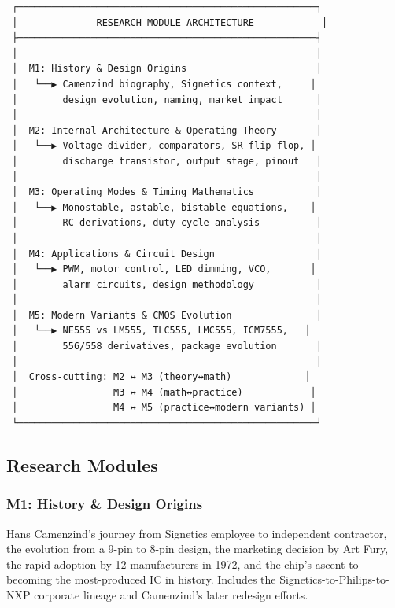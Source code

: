 \documentclass[11pt,letterpaper]{article}
\begin{document}
\begin{asciibox}
\begin{verbatim}
 ┌─────────────────────────────────────────────────────┐
 │              RESEARCH MODULE ARCHITECTURE            │
 ├─────────────────────────────────────────────────────┤
 │                                                     │
 │  M1: History & Design Origins                       │
 │   └──▶ Camenzind biography, Signetics context,     │
 │        design evolution, naming, market impact      │
 │                                                     │
 │  M2: Internal Architecture & Operating Theory       │
 │   └──▶ Voltage divider, comparators, SR flip-flop, │
 │        discharge transistor, output stage, pinout   │
 │                                                     │
 │  M3: Operating Modes & Timing Mathematics           │
 │   └──▶ Monostable, astable, bistable equations,    │
 │        RC derivations, duty cycle analysis          │
 │                                                     │
 │  M4: Applications & Circuit Design                  │
 │   └──▶ PWM, motor control, LED dimming, VCO,       │
 │        alarm circuits, design methodology           │
 │                                                     │
 │  M5: Modern Variants & CMOS Evolution               │
 │   └──▶ NE555 vs LM555, TLC555, LMC555, ICM7555,   │
 │        556/558 derivatives, package evolution       │
 │                                                     │
 │  Cross-cutting: M2 ↔ M3 (theory↔math)             │
 │                 M3 ↔ M4 (math↔practice)            │
 │                 M4 ↔ M5 (practice↔modern variants) │
 └─────────────────────────────────────────────────────┘
\end{verbatim}
\end{asciibox}

\subsection{Research Modules}

\subsubsection{M1: History \& Design Origins}

Hans Camenzind's journey from Signetics employee to independent contractor, the evolution from a 9-pin to 8-pin design, the marketing decision by Art Fury, the rapid adoption by 12 manufacturers in 1972, and the chip's ascent to becoming the most-produced IC in history. Includes the Signetics-to-Philips-to-NXP corporate lineage and Camenzind's later redesign efforts.
\end{document}
